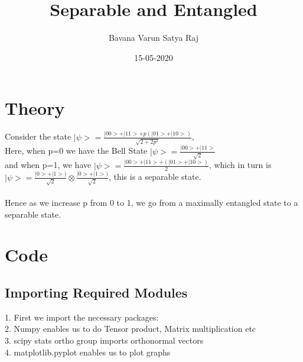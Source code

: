 \documentclass{article}
\title{Separable and Entangled}
\date{15-05-2020}
\author{Bavana Varun Satya Raj}
\begin{document}
  \maketitle
  \section*{Theory}
  Consider the state $|\psi>=\frac{|00>+|11>+p(|01>+|10>)}{\sqrt{2+2p^2}}$,\\              	Here, when p=0 we have the Bell State $|\psi>=\frac{|00>+|11>}{\sqrt{2}}$  	\\and when p=1, we have $|\psi>=\frac{|00>+|11>+(|01>+|10>)}{2}$,
  	which in turn is\\ $|\psi>=\frac{|0>+|1>)}{\sqrt{2}}\otimes\frac{|0>+|1>)}{\sqrt{2}}$, this is a separable state.\\\\
  	Hence as we increase p from 0 to 1, we go from a maximally 				entangled state to a separable state.
  
  \section*{Code}  
  \subsection*{Importing Required Modules}  
   1. First we import the necessary packages:\\
   2. Numpy enables us to do Tensor product, Matrix multiplication etc\\
   3. scipy stats ortho group imports orthonormal vectors\\
   4. matplotlib.pyplot enables us to plot graphs   
\end{document}
